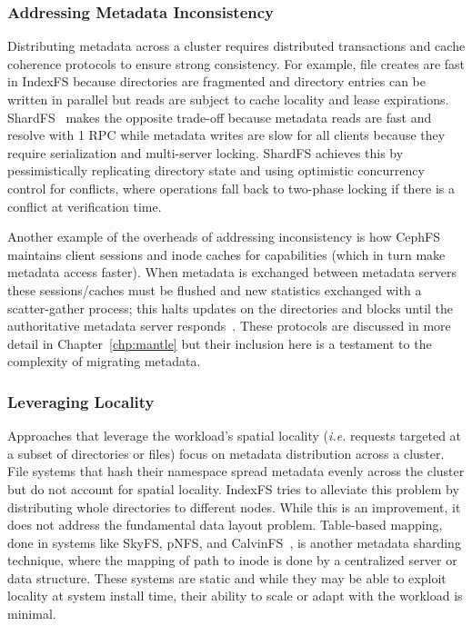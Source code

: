 \subsubsection{Addressing Metadata Inconsistency}

Distributing metadata across a cluster requires distributed transactions and
cache coherence protocols to ensure strong consistency.  For example, file
creates are fast in IndexFS because directories are fragmented and directory
entries can be written in parallel but reads are subject to cache locality and
lease expirations.  ShardFS~\cite{xiao:socc15-shardfs} makes the opposite
trade-off because metadata reads are fast and resolve with 1 RPC while metadata
writes are slow for all clients because they require serialization and
multi-server locking.  ShardFS achieves this by pessimistically replicating
directory state and using optimistic concurrency control for conflicts, where
operations fall back to two-phase locking if there is a conflict at
verification time.

Another example of the overheads of addressing inconsistency is how CephFS
maintains client sessions and inode caches for capabilities (which in turn make
metadata access faster). When metadata is exchanged between metadata servers
these sessions/caches must be flushed and new statistics exchanged with a
scatter-gather process; this halts updates on the directories and blocks until
the authoritative metadata server responds~\cite{docs:cephinternals}.  These
protocols are discussed in more detail in Chapter~\ref{chp:mantle} but their
inclusion here is a testament to the complexity of migrating metadata.

\subsubsection{Leveraging Locality}

Approaches that leverage the workload's spatial locality ({\it i.e.} requests
targeted at a subset of directories or files) focus on metadata distribution
across a cluster. File systems that hash their namespace spread metadata
evenly across the cluster but do not account for spatial locality.  IndexFS
tries to alleviate this problem by distributing whole directories to different
nodes.  While this is an improvement, it does not address the fundamental data
layout problem.  Table-based mapping, done in systems like SkyFS, pNFS, and
CalvinFS~\cite{thomson:fast2015-calvinfs}, is another metadata sharding
technique, where the mapping of path to inode is done by a centralized server
or data structure. These systems are static and while they may be able to
exploit locality at system install time, their ability to scale or adapt with
the workload is minimal.

